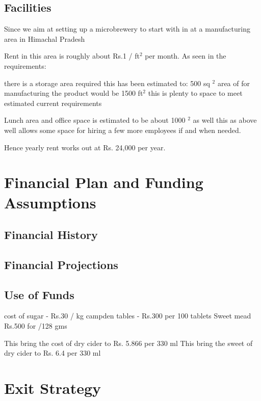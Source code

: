 \documentclass[11pt]{article}
\begin{document}
  \subsection{Facilities}
Since we aim at setting up a microbrewery to start with in at a manufacturing area in Himachal Pradesh

Rent in this area is roughly about Rs.1 / ft$^2$ per month.
As seen in the requirements:

there is a storage area required this has been estimated to: 500 sq $^2$
area of for manufacturing the product would be 1500 ft$^2$ this is plenty to space to meet estimated current requirements

Lunch area and office space is estimated to be about 1000 $^2$ as well this as above well allows some space for hiring a few more employees if and when needed.

Hence yearly rent works out at Rs. 24,000 per year.
\section{Financial Plan and Funding Assumptions}
  \subsection{Financial History}
  \subsection{Financial Projections}
  \subsection{Use of Funds}
   
cost of sugar -  Rs.30 / kg
campden tables  - Rs.300 per 100 tablets
Sweet mead Rs.500 for /128 gms 


This bring the cost of dry cider to Rs. 5.866 per 330 ml
This bring the sweet of dry cider to Rs. 6.4 per 330 ml
\section{Exit Strategy}
\end{document}
